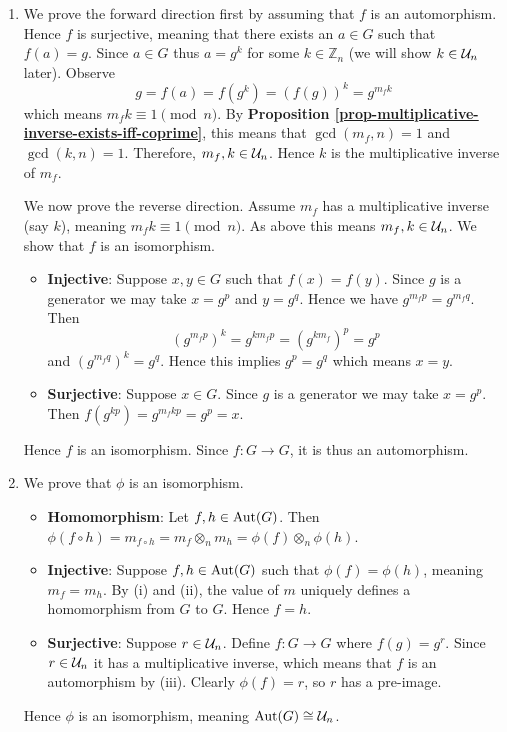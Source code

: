 \begin{enumerate}
\begin{enumerate}[label=(\roman*)]
        \item We prove the forward direction first by assuming that $f$ is an automorphism. Hence $f$ is surjective, meaning that there exists an $a \in G$ such that $f(a) = g$. Since $a \in G$ thus $a = g^k$ for some $k \in \mathbb{Z}_n$ (we will show $k \in \mathcal{U}_{n}$ later). Observe
        \[
            g = f(a) = f(g^k) = (f(g))^k = g^{m_fk}        
        \]
        which means $m_fk \equiv 1 \pmod n$. By \textbf{Proposition \ref{prop-multiplicative-inverse-exists-iff-coprime}}, this means that $\gcd(m_f, n) = 1$ and $\gcd(k, n) = 1$. Therefore, $m_f, k \in \mathcal{U}_{n}$. Hence $k$ is the multiplicative inverse of $m_f$.
        
        We now prove the reverse direction. Assume $m_f$ has a multiplicative inverse (say $k$), meaning $m_fk \equiv 1 \pmod n$. As above this means $m_f, k \in \mathcal{U}_{n}$. We show that $f$ is an isomorphism.
        \begin{itemize}
            \item \textbf{Injective}: Suppose $x, y \in G$ such that $f(x) = f(y)$. Since $g$ is a generator we may take $x = g^p$ and $y = g^q$. Hence we have $g^{m_fp} = g^{m_fq}$. Then
            \[
                \left(g^{m_fp}\right)^k = g^{km_fp} = \left(g^{km_f}\right)^p = g^p            
            \]
            and $\left(g^{m_fq}\right)^k = g^q$. Hence this implies $g^p = g^q$ which means $x = y$.
            \item \textbf{Surjective}: Suppose $x \in G$. Since $g$ is a generator we may take $x = g^p$. Then $f(g^{kp}) = g^{m_fkp} = g^p = x$.
        \end{itemize}
        Hence $f$ is an isomorphism. Since $f: G \to G$, it is thus an automorphism.
        
        \item We prove that $\phi$ is an isomorphism.
        \begin{itemize}
            \item \textbf{Homomorphism}: Let $f, h \in \mathrm{Aut}(G)$. Then $\phi(f\circ h) = m_{f\circ h} = m_f \otimes_n m_h = \phi(f)\otimes_n\phi(h)$.
            \item \textbf{Injective}: Suppose $f, h \in \mathrm{Aut}(G)$ such that $\phi(f) = \phi(h)$, meaning $m_f = m_h$. By (i) and (ii), the value of $m$ uniquely defines a homomorphism from $G$ to $G$. Hence $f = h$.
            \item \textbf{Surjective}: Suppose $r \in \mathcal{U}_{n}$. Define $f: G \to G$ where $f(g) = g^r$. Since $r \in \mathcal{U}_{n}$ it has a multiplicative inverse, which means that $f$ is an automorphism by (iii). Clearly $\phi(f) = r$, so $r$ has a pre-image.
        \end{itemize}
        Hence $\phi$ is an isomorphism, meaning $\mathrm{Aut}(G) \cong \mathcal{U}_{n}$.
    \end{enumerate}
\end{enumerate}

